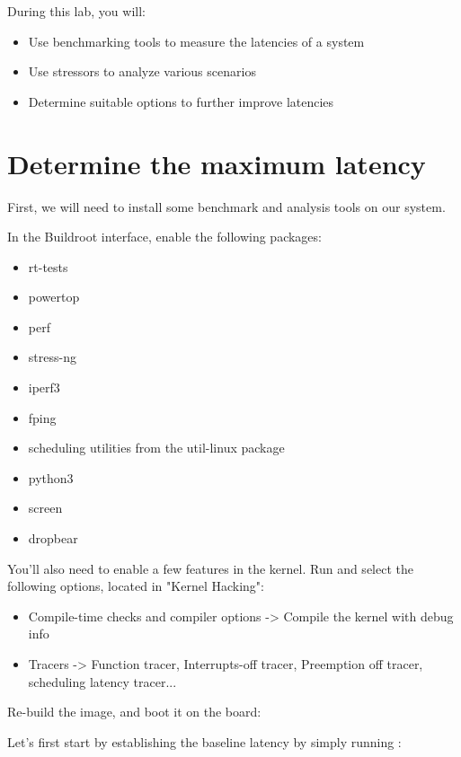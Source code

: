 
During this lab, you will:
\begin{itemize}
  \item Use benchmarking tools to measure the latencies of a system
  \item Use stressors to analyze various scenarios
  \item Determine suitable options to further improve latencies
\end{itemize}

\section{Determine the maximum latency}

First, we will need to install some benchmark and analysis tools on our system.

In the Buildroot  interface, enable the following packages:

\begin{itemize}
	\item rt-tests
	\item powertop
	\item perf
	\item stress-ng
	\item iperf3
	\item fping
	\item scheduling utilities from the util-linux package
	\item python3
	\item screen
	\item dropbear
\end{itemize}

You'll also need to enable a few features in the kernel. Run  and select
the following options, located in "Kernel Hacking":

\begin{itemize}
	\item Compile-time checks and compiler options -> Compile the kernel with debug info
	\item Tracers -> Function tracer, Interrupts-off tracer, Preemption off tracer, scheduling latency tracer...
\end{itemize}

Re-build the image, and boot it on the board: 

Let's first start by establishing the baseline latency by simply running :

